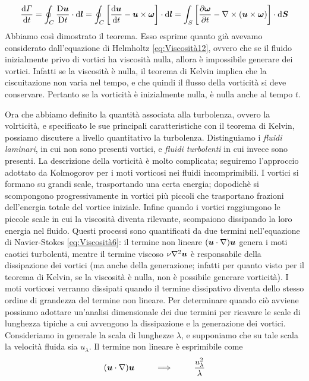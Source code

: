 \begin{equation}
\der{\Gamma}{t} = \oint_C \derL{\V{u}}{t} \cdot \dd \V{l} = \oint_C \quadre{\der{\V{u}}{t} - \vett{u}{\omega}}\cdot \dd \V{l} = \int_S \quadre{\derP{\V{\omega}}{t}-\Rot{}(\vett{u}{\omega})}\cdot \dd \V{S}
\end{equation}
Abbiamo così dimostrato il teorema. Esso esprime quanto già avevamo considerato dall'equazione di Helmholtz \ref{eq:Viscosità12}, ovvero che se il fluido inizialmente privo di vortici ha viscosità nulla, allora è impossibile generare dei vortici. Infatti se la viscosità è nulla, il teorema di Kelvin implica che la ciscuitazione non varia nel tempo, e che quindi il flusso della vorticità si deve conservare. Pertanto se la vorticità è inizialmente nulla, è nulla anche al tempo $t$.

Ora che abbiamo definito la quantità associata alla turbolenza, ovvero la volrticità, e specificato le sue principali caratteristiche con il teorema di Kelvin, possiamo discutere a livello quantitativo la turbolenza. Distinguiamo i \textit{fluidi laminari}, in cui non sono presenti vortici, e \textit{fluidi turbolenti} in cui invece sono presenti. La descrizione della vorticità è molto complicata; seguiremo l'approccio adottato da Kolmogorov per i moti vorticosi nei fluidi incomprimibili. I vortici si formano su grandi scale, trasportando una certa energia; dopodichè si scompongono progressivamente in vortici più piccoli che trasportano frazioni dell'energia totale del vortice iniziale. Infine quando i vortici raggiungono le piccole scale in cui la viscosità diventa rilevante, scompaiono dissipando la loro energia nel fluido. Questi processi sono quantificati da due termini nell'equazione di Navier-Stokes \ref{eq:Viscosità6}: il termine non lineare $(\scal{u}{\nabla})\V{u}$ genera i moti caotici turbolenti, mentre il termine viscoso $\nu\Grad^2 \V{u}$ è responsabile della dissipazione dei vortici (ma anche della generazione; infatti per quanto visto per il teorema di Kelvin, se la viscosità è nulla, non è possibile generare vorticità). I moti vorticosi verranno dissipati quando il termine dissipativo diventa dello stesso ordine di grandezza del termine non lineare. Per determinare quando ciò avviene possiamo adottare un'analisi dimensionale dei due termini per ricavare le scale di lunghezza tipiche a cui avvengono la dissipazione e la generazione dei vortici. Consideriamo in generale la scala di lunghezze $\lambda$, e supponiamo che su tale scala la velocità fluida sia $u_\lambda$. Il termine non lineare è esprimibile come
\begin{equation}
(\scal{u}{\nabla})\V{u} \,\,\,\,\,\,\,\,\,\,\,\,\,\,\, \Longrightarrow \,\,\,\,\,\,\,\,\,\,\,\,\,\,\,\dfrac{u_\lambda^2}{\lambda} \label{eq:Viscosità13}
\end{equation}
